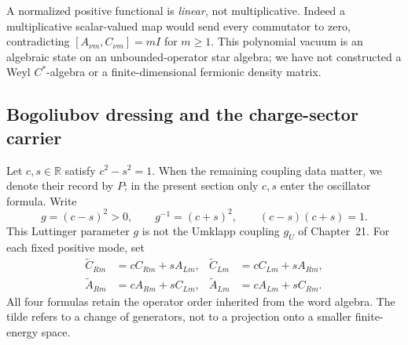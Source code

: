 \begin{remark}
A normalized positive functional is \emph{linear}, not multiplicative.
Indeed a multiplicative scalar-valued map would send every commutator to
zero, contradicting \([A_{\nu m},C_{\nu m}]=mI\) for \(m\geq1\).
This polynomial vacuum is an algebraic state on an unbounded-operator
star algebra; we have not constructed a Weyl \(C^*\)-algebra or a
finite-dimensional fermionic density matrix.
\end{remark}

\subsection{Bogoliubov dressing and the charge-sector carrier}
\label{subsec:ch20b-dressed}

Let \(c,s\in\mathbb R\) satisfy \(c^2-s^2=1\).  When the remaining
coupling data matter, we denote their record by \(P\); in the present
section only \(c,s\) enter the oscillator formula.  Write
\begin{equation}
 g=(c-s)^2>0,\qquad g^{-1}=(c+s)^2,\qquad
 (c-s)(c+s)=1.
 \label{eq:ch20b-g}
\end{equation}
This Luttinger parameter \(g\) is not the Umklapp coupling \(g_U\) of
Chapter~21.  For each fixed positive mode, set
\begin{align}
 \widetilde C_{Rm}&=cC_{Rm}+sA_{Lm},
 &\widetilde C_{Lm}&=cC_{Lm}+sA_{Rm},
 \label{eq:ch20b-bog-creator}\\
 \widetilde A_{Rm}&=cA_{Rm}+sC_{Lm},
 &\widetilde A_{Lm}&=cA_{Lm}+sC_{Rm}.
 \label{eq:ch20b-bog-ann}
\end{align}
All four formulas retain the operator order inherited from the word
algebra.  The tilde refers to a change of generators, not to a
projection onto a smaller finite-energy space.

